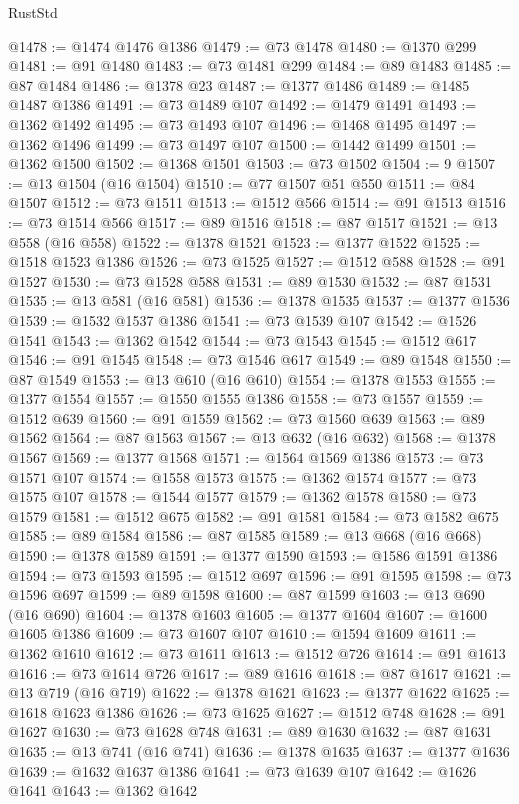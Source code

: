 \begin{lexlean}{RustStd}
\begin{coremodule}
@1478 := @1474 @1476 @1386
@1479 := @73 @1478
@1480 := @1370 @299
@1481 := @91 @1480
@1483 := @73 @1481 @299
@1484 := @89 @1483
@1485 := @87 @1484
@1486 := @1378 @23
@1487 := @1377 @1486
@1489 := @1485 @1487 @1386
@1491 := @73 @1489 @107
@1492 := @1479 @1491
@1493 := @1362 @1492
@1495 := @73 @1493 @107
@1496 := @1468 @1495
@1497 := @1362 @1496
@1499 := @73 @1497 @107
@1500 := @1442 @1499
@1501 := @1362 @1500
@1502 := @1368 @1501
@1503 := @73 @1502
@1504 := 9
@1507 := @13 @1504 (@16 @1504)
@1510 := @77 @1507 @51 @550
@1511 := @84 @1507
@1512 := @73 @1511
@1513 := @1512 @566
@1514 := @91 @1513
@1516 := @73 @1514 @566
@1517 := @89 @1516
@1518 := @87 @1517
@1521 := @13 @558 (@16 @558)
@1522 := @1378 @1521
@1523 := @1377 @1522
@1525 := @1518 @1523 @1386
@1526 := @73 @1525
@1527 := @1512 @588
@1528 := @91 @1527
@1530 := @73 @1528 @588
@1531 := @89 @1530
@1532 := @87 @1531
@1535 := @13 @581 (@16 @581)
@1536 := @1378 @1535
@1537 := @1377 @1536
@1539 := @1532 @1537 @1386
@1541 := @73 @1539 @107
@1542 := @1526 @1541
@1543 := @1362 @1542
@1544 := @73 @1543
@1545 := @1512 @617
@1546 := @91 @1545
@1548 := @73 @1546 @617
@1549 := @89 @1548
@1550 := @87 @1549
@1553 := @13 @610 (@16 @610)
@1554 := @1378 @1553
@1555 := @1377 @1554
@1557 := @1550 @1555 @1386
@1558 := @73 @1557
@1559 := @1512 @639
@1560 := @91 @1559
@1562 := @73 @1560 @639
@1563 := @89 @1562
@1564 := @87 @1563
@1567 := @13 @632 (@16 @632)
@1568 := @1378 @1567
@1569 := @1377 @1568
@1571 := @1564 @1569 @1386
@1573 := @73 @1571 @107
@1574 := @1558 @1573
@1575 := @1362 @1574
@1577 := @73 @1575 @107
@1578 := @1544 @1577
@1579 := @1362 @1578
@1580 := @73 @1579
@1581 := @1512 @675
@1582 := @91 @1581
@1584 := @73 @1582 @675
@1585 := @89 @1584
@1586 := @87 @1585
@1589 := @13 @668 (@16 @668)
@1590 := @1378 @1589
@1591 := @1377 @1590
@1593 := @1586 @1591 @1386
@1594 := @73 @1593
@1595 := @1512 @697
@1596 := @91 @1595
@1598 := @73 @1596 @697
@1599 := @89 @1598
@1600 := @87 @1599
@1603 := @13 @690 (@16 @690)
@1604 := @1378 @1603
@1605 := @1377 @1604
@1607 := @1600 @1605 @1386
@1609 := @73 @1607 @107
@1610 := @1594 @1609
@1611 := @1362 @1610
@1612 := @73 @1611
@1613 := @1512 @726
@1614 := @91 @1613
@1616 := @73 @1614 @726
@1617 := @89 @1616
@1618 := @87 @1617
@1621 := @13 @719 (@16 @719)
@1622 := @1378 @1621
@1623 := @1377 @1622
@1625 := @1618 @1623 @1386
@1626 := @73 @1625
@1627 := @1512 @748
@1628 := @91 @1627
@1630 := @73 @1628 @748
@1631 := @89 @1630
@1632 := @87 @1631
@1635 := @13 @741 (@16 @741)
@1636 := @1378 @1635
@1637 := @1377 @1636
@1639 := @1632 @1637 @1386
@1641 := @73 @1639 @107
@1642 := @1626 @1641
@1643 := @1362 @1642

\end{coremodule}
\end{lexlean}
